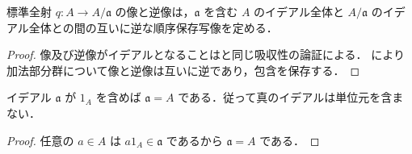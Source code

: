 \begin{prop}[イデアル対応]
標準全射 $q:A\to A/\mathfrak a$ の像と逆像は，$\mathfrak a$ を含む $A$ のイデアル全体と $A/\mathfrak a$ のイデアル全体との間の互いに逆な順序保存写像を定める．
\end{prop}
\begin{proof}
像及び逆像がイデアルとなることはと同じ吸収性の論証による． により加法部分群について像と逆像は互いに逆であり，包含を保存する．
\end{proof}
\begin{prop}[単位元を含むイデアル]
イデアル $\mathfrak a$ が $1_A$ を含めば $\mathfrak a=A$ である．従って真のイデアルは単位元を含まない．
\end{prop}
\begin{proof}
任意の $a\in A$ は $a1_A\in\mathfrak a$ であるから $\mathfrak a=A$ である．
\end{proof}
